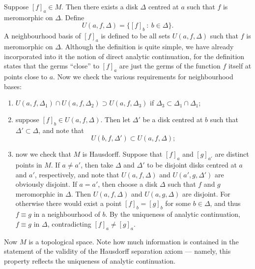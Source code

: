 \documentclass[a4paper,11pt]{article}
\begin{document}
Suppose $[f]_a \in M$.  Then there exists a disk $\Delta$ centred at
$a$ such that $f$ is meromorphic on $\Delta$.  Define
$$
U(a,f,\Delta) = \{[f]_b ~:~ b\in \Delta\}.
$$
A neighbourhood basis of $[f]_a$ is defined to be all sets
$U(a,f,\Delta)$ such that $f$ is meromorphic on $\Delta$.  Although
the definition is quite simple, we have already incorporated into it
the notion of direct analytic continuation, for the definition states
that the germs ``close'' to $[f]_a$ are just the germs of the function
$f$ itself at points close to $a$.  Now we check the various
requirements for neighbourhood bases:
\begin{enumerate}
\item $U(a,f,\Delta_1) \cap U(a,f,\Delta_2) \supset U(a,f,\Delta_3)$
  if $\Delta_3 \subset \Delta_1 \cap \Delta_1$;
\item suppose $[f]_b \in U(a,f,\Delta)$.  Then let $\Delta'$ be a disk
  centred at $b$ such that $\Delta' \subset \Delta$, and note that
  $$
  U(b,f,\Delta') \subset U(a,f,\Delta);
  $$
  \begin{center}
  \end{center}

\item now we check that $M$ is Hausdorff.  Suppose that $[f]_a$ and
  $[g]_{a'}$ are distinct points in $M$.  If $a\ne a'$, then take
  $\Delta$ and $\Delta'$ to be disjoint disks centred at $a$ and $a'$,
  respectively, and note that $U(a,f,\Delta)$ and $U(a',g,\Delta')$
  are obviously disjoint.  If $a=a'$, then choose a disk $\Delta$ such
  that $f$ and $g$ meromorphic in $\Delta$.  Then $U(a,f,\Delta)$ and
  $U(a, g, \Delta)$ are disjoint.  For otherwise there would exist a
  point $[f]_b = [g]_b$ for some $b \in \Delta$, and thus $f \equiv g$
  in a neighbourhood of $b$.  By the uniqueness of analytic
  continuation, $f \equiv g$ in $\Delta$, contradicting $[f]_a \ne
  [g]_a$.
\end{enumerate}

Now $M$ is a topological space.  Note how much information is
contained in the statement of the validity of the Hausdorff separation
axiom --- namely, this property reflects the uniqueness of analytic
continuation.
\end{document}
